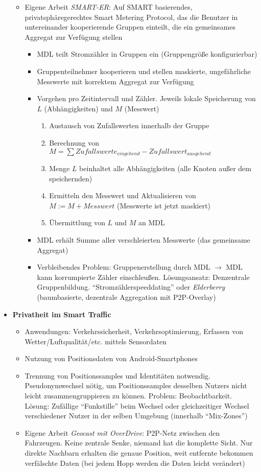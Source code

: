 \begin{itemize}
\begin{itemize}
\begin{itemize}
		\end{itemize}
		\item Eigene Arbeit \textit{SMART-ER}: Auf SMART basierendes, privatsphäregerechtes Smart Metering Protocol, das die Benutzer in untereinander kooperierende Gruppen einteilt, die ein gemeinsames Aggregat zur Verfügung stellen
		\begin{itemize}
			\item MDL teilt Stromzähler in Gruppen ein (Gruppengröße konfigurierbar)
			\item Gruppenteilnehmer kooperieren und stellen maskierte, ungefährliche Messwerte mit korrektem Aggregat zur Verfügung
			\item Vorgehen pro Zeitintervall und Zähler. Jeweils lokale Speicherung von \(L\) (Abhängigkeiten) und \(M\) (Messwert)
			\begin{enumerate}
				\item Austausch von Zufallswerten innerhalb der Gruppe
				\item Berechnung von \(M = \sum Zufallswerte_{eingehend} - Zufallswert_{ausgehend}\)
				\item Menge \(L\) beinhaltet alle Abhängigkeiten (alle Knoten außer dem speichernden)
				\item Ermitteln den Messwert und Aktualisieren von \(M := M + Messwert\) (Messwerte ist jetzt maskiert)
				\item Übermittlung von \(L\) und \(M\) an MDL
			\end{enumerate}
			\item MDL erhält Summe aller verschleierten Messwerte (das gemeinsame Aggregat)
			\item Verbleibendes Problem: Gruppenerstellung durch MDL \(\rightarrow\) MDL kann korrumpierte Zähler einschleußen. Lösungsansatz: Denzentrale Gruppenbildung. "`Stromzählerspeeddating"' oder \textit{Elderberry} (baumbasierte, dezentrale Aggregation mit P2P-Overlay)
		\end{itemize}
	\end{itemize}
	\item \textbf{Privatheit im Smart Traffic}
	\begin{itemize}
		\item Anwendungen: Verkehrssicherheit, Verkehrsoptimierung, Erfassen von Wetter/Luftqualität/etc. mittels Sensordaten
		\item Nutzung von Positionsdaten von Android-Smartphones
		\item Trennung von Positionssamples und Identitäten notwendig. Pseudonymwechsel nötig, um Positionssamples desselben Nutzers nicht leicht zusammengruppieren zu können. Problem: Beobachtbarkeit. Lösung: Zufällige "`Funkstille"' beim Wechsel oder gleichzeitiger Wechsel verschiedener Nutzer in der selben Umgebung (innerhalb "`Mix-Zones"')
		\item Eigene Arbeit \textit{Geocast mit OverDrive}: P2P-Netz zwischen den Fahrzeugen. Keine zentrale Senke, niemand hat die komplette Sicht. Nur direkte Nachbarn erhalten die genaue Position, weit entfernte bekommen verfälschte Daten (bei jedem Hopp werden die Daten leicht verändert)
	\end{itemize}
\end{itemize}
